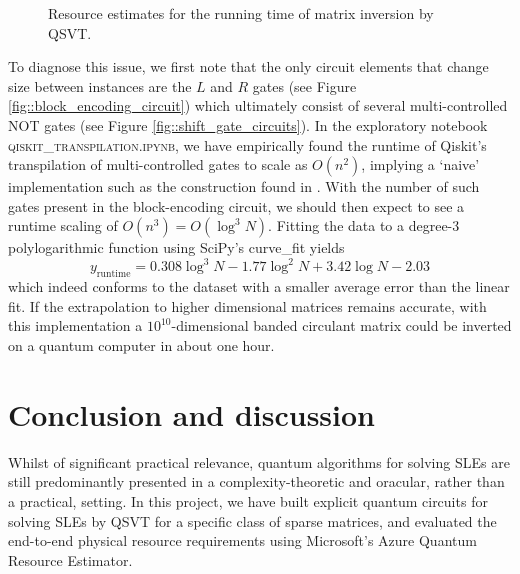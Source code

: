 \documentclass[10pt, twocolumn]{article}
\begin{document}
\begin{figure}
	\centering
	\caption{Resource estimates for the running time of matrix inversion by QSVT.}
	\label{fig::qre_runtime}
\end{figure}

To diagnose this issue, we first note that the only circuit elements that change size between instances are the $L$ and $R$ gates (see Figure \ref{fig::block_encoding_circuit}) which ultimately consist of several multi-controlled \textsc{NOT} gates (see Figure \ref{fig::shift_gate_circuits}). In the exploratory notebook \textsc{qiskit\_transpilation.ipynb}, we have empirically found the runtime of Qiskit's transpilation of multi-controlled gates to scale as $O(n^2)$, implying a `naive' implementation such as the construction found in \cite{barenco1995elementary}. With the number of such gates present in the block-encoding circuit, we should then expect to see a runtime scaling of $O(n^3) = O(\log^3{N})$. Fitting the data to a degree-3 polylogarithmic function using SciPy's curve\_fit yields
\[
	y_\text{runtime} = 0.308 \log^3{N} - 1.77 \log^2{N} + 3.42 \log{N} - 2.03
\]
which indeed conforms to the dataset with a smaller average error than the linear fit. If the extrapolation to higher dimensional matrices remains accurate, with this implementation a $10^{10}$-dimensional banded circulant matrix could be inverted on a quantum computer in about one hour.

\section{Conclusion and discussion}

Whilst of significant practical relevance, quantum algorithms for solving SLEs are still predominantly presented in a complexity-theoretic and oracular, rather than a practical, setting. In this project, we have built explicit quantum circuits for solving SLEs by QSVT for a specific class of sparse matrices, and evaluated the end-to-end physical resource requirements using Microsoft's Azure Quantum Resource Estimator.
\end{document}

